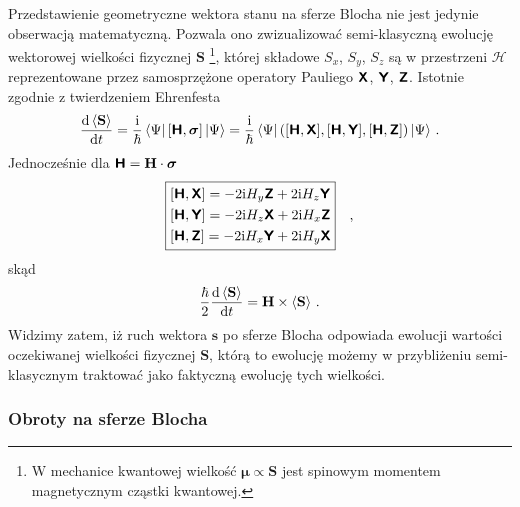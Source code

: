 \documentclass{myclass}
\begin{document}
Przedstawienie geometryczne wektora stanu na sferze Blocha nie jest jedynie obserwacją matematyczną.
Pozwala ono zwizualizować semi-klasyczną ewolucję wektorowej wielkości fizycznej \(\mathbf{S}\)
\footnote{W mechanice kwantowej wielkość \(\boldsymbol{\mu} \propto \mathbf{S}\) jest spinowym
momentem magnetycznym cząstki kwantowej.}, której składowe \(S_x\), \(S_y\), \(S_z\) są w
przestrzeni \(\mathscr{H}\) reprezentowane przez samosprzężone operatory Pauliego \(\boldsymbol{\mathsf{X}}\),
\(\boldsymbol{\mathsf{Y}}\), \(\boldsymbol{\mathsf{Z}}\). Istotnie zgodnie z twierdzeniem Ehrenfesta
\begin{equation*}
    \dv{\expval{\mathbf{S}}}{t} = \frac{\mathrm{i}}{\hbar}\bra{\Psi}[\boldsymbol{\mathsf{H}}, \boldsymbol{\sigma}]\ket{\Psi} = \frac{\mathrm{i}}{\hbar}\bra{\Psi}\left([\boldsymbol{\mathsf{H}},\boldsymbol{\mathsf{X}}],[\boldsymbol{\mathsf{H}},\boldsymbol{\mathsf{Y}}],[\boldsymbol{\mathsf{H}},\boldsymbol{\mathsf{Z}}]\right)\ket{\Psi}\,.
\end{equation*}
Jednocześnie dla \(\boldsymbol{\mathsf{H}} = \mathbf{H}\cdot\boldsymbol{\sigma}\)
\begin{equation*}\boxed{
    \begin{split}
        &[\boldsymbol{\mathsf{H}},\boldsymbol{\mathsf{X}}] = -2\mathrm{i} H_y\boldsymbol{\mathsf{Z}} + 2\mathrm{i} H_z \boldsymbol{\mathsf{Y}}\\
        &[\boldsymbol{\mathsf{H}},\boldsymbol{\mathsf{Y}}] = -2\mathrm{i} H_z\boldsymbol{\mathsf{X}} + 2\mathrm{i} H_x \boldsymbol{\mathsf{Z}}\\
        &[\boldsymbol{\mathsf{H}},\boldsymbol{\mathsf{Z}}] = -2\mathrm{i} H_x\boldsymbol{\mathsf{Y}} + 2\mathrm{i} H_y \boldsymbol{\mathsf{X}}
    \end{split}}\quad,
\end{equation*}
skąd
\begin{equation*}
    \frac{\hbar}{2}\dv{\expval{\mathbf{S}}}{t} = \mathbf{H} \times \expval{\mathbf{S}}\,.
\end{equation*}
Widzimy zatem, iż ruch wektora \(\mathbf{s}\) po sferze Blocha odpowiada ewolucji wartości
oczekiwanej wielkości fizycznej \(\mathbf{S}\), którą to ewolucję możemy w przybliżeniu
semi-klasycznym traktować jako faktyczną ewolucję tych wielkości.

\subsubsection{Obroty na sferze Blocha}
\end{document}

